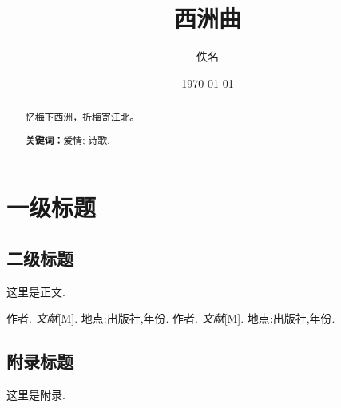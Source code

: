 \documentclass[12pt, a4paper, oneside, fontset=windows]{ctexart}
\title{\textbf{西洲曲}}
\author{佚名}
\date{\today}
\begin{document}
\pagestyle{empty}
\maketitle

\setcounter{page}{0}
\maketitle
\thispagestyle{empty}


\begin{abstract}
    忆梅下西洲，折梅寄江北。
    \par\textbf{关键词：}爱情; 诗歌.
\end{abstract}


\newpage
\setcounter{page}{1}
\tableofcontents
\newpage
\setcounter{page}{1}

\newpage
\section{一级标题}

\subsection{二级标题}
这里是正文.

\newpage

\begin{thebibliography}{99}
    作者. \emph{文献}[M]. 地点:出版社,年份.
    作者. \emph{文献}[M]. 地点:出版社,年份.
\end{thebibliography}


\newpage

\begin{appendices}
    \renewcommand{\thesection}{\Alph{section}}
    \section{附录标题}
    这里是附录.
\end{appendices}
\end{document}
